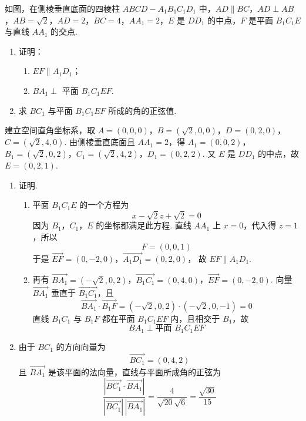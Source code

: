 \begin{problem}
如图，在侧棱垂直底面的四棱柱 \(ABCD - A_{1}B_{1}C_{1}D_{1}\) 中，\(AD \parallel BC\)，\(AD \perp AB\)，\(AB = \sqrt{2}\)，\(AD = 2\)，\(BC = 4\)，\(AA_{1} = 2\)，\(E\) 是 \(DD_{1}\) 的中点，\(F\) 是平面 \(B_{1}C_{1}E\) 与直线 \(AA_{1}\) 的交点.

\begin{enumerate}
    \item 证明：
    \begin{enumerate}
    \item \(EF \parallel A_{1}D_{1}\)；
\item \(BA_{1} \perp\) 平面 \(B_{1}C_{1}EF\).
\end{enumerate}
\item 求 \(BC_{1}\) 与平面 \(B_{1}C_{1}EF\) 所成的角的正弦值.
\end{enumerate}

\end{problem}

\begin{solution}
建立空间直角坐标系，取 \(A=(0,0,0)\)，\(B=(\sqrt2,0,0)\)，\(D=(0,2,0)\)，\(C=(\sqrt2,4,0)\).
由侧棱垂直底面且 \(AA_1=2\)，得
\(A_1=(0,0,2)\)，\(B_1=(\sqrt2,0,2)\)，\(C_1=(\sqrt2,4,2)\)，\(D_1=(0,2,2)\).
又 \(E\) 是 \(DD_1\) 的中点，故 \(E=(0,2,1)\).

\begin{enumerate}
\item 证明.
\begin{enumerate}
\item 平面 \(B_1C_1E\) 的一个方程为
\[
x-\sqrt2z+\sqrt2=0
\]
因为 \(B_1\)，\(C_1\)，\(E\) 的坐标都满足此方程. 直线 \(AA_1\) 上 \(x=0\)，代入得 \(z=1\)，所以
\[
F=(0,0,1)
\]
于是
\(\overrightarrow{EF}=(0,-2,0)\)，\(\overrightarrow{A_1D_1}=(0,2,0)\)，
故 \(EF\parallel A_1D_1\).

\item 再有
\(\overrightarrow{BA_1}=(-\sqrt2,0,2)\)，\(\overrightarrow{B_1C_1}=(0,4,0)\)，\(\overrightarrow{EF}=(0,-2,0)\).
向量 \(\overrightarrow{BA_1}\) 垂直于 \(\overrightarrow{B_1C_1}\)，且
\[
\overrightarrow{BA_1}\cdot\overrightarrow{B_1F}
=(-\sqrt2,0,2)\cdot(-\sqrt2,0,-1)=0
\]
直线 \(B_1C_1\) 与 \(B_1F\) 都在平面 \(B_1C_1EF\) 内，且相交于 \(B_1\)，故
\[
BA_1\perp\text{平面 }B_1C_1EF
\]

\end{enumerate}
\item 由于 \(BC_1\) 的方向向量为
\[
\overrightarrow{BC_1}=(0,4,2)
\]
且 \(\overrightarrow{BA_1}\) 是该平面的法向量，直线与平面所成角的正弦为
\[
\frac{|\overrightarrow{BC_1}\cdot\overrightarrow{BA_1}|}
{|\overrightarrow{BC_1}|\,|\overrightarrow{BA_1}|}
=\frac4{\sqrt{20}\sqrt6}
=\frac{\sqrt{30}}{15}
\]
\end{enumerate}
\end{solution}

